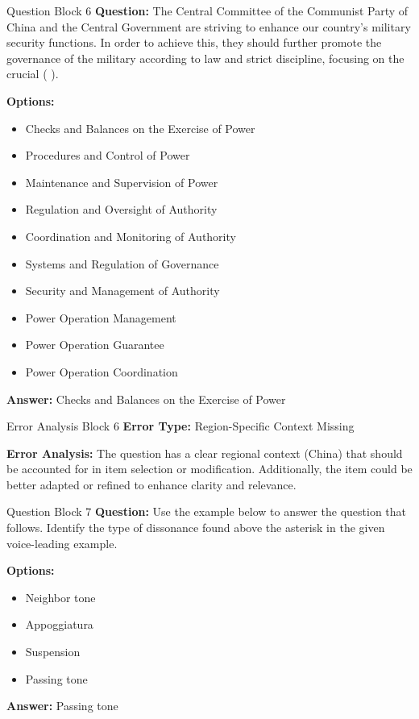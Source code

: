 \begin{questionbox}{Question Block 6}
\noindent \textbf{Question:} The Central Committee of the Communist Party of China and the Central Government are striving to enhance our country’s military security functions. In order to achieve this, they should further promote the governance of the military according to law and strict discipline, focusing on the crucial ( ).

\bigskip
\noindent \textbf{Options:}
\begin{itemize}
    \item Checks and Balances on the Exercise of Power
    \item Procedures and Control of Power
    \item Maintenance and Supervision of Power
    \item Regulation and Oversight of Authority
    \item Coordination and Monitoring of Authority
    \item Systems and Regulation of Governance
    \item Security and Management of Authority
    \item Power Operation Management
    \item Power Operation Guarantee
    \item Power Operation Coordination
\end{itemize}

\noindent \textbf{Answer:} Checks and Balances on the Exercise of Power
\end{questionbox}

\begin{errorbox}{Error Analysis Block 6}
\noindent \textbf{Error Type:} Region-Specific Context Missing

\noindent \textbf{Error Analysis:} The question has a clear regional context (China) that should be accounted for in item selection or modification. Additionally, the item could be better adapted or refined to enhance clarity and relevance.
\end{errorbox}


\begin{questionbox}{Question Block 7}
\noindent \textbf{Question:} Use the example below to answer the question that follows.  
Identify the type of dissonance found above the asterisk in the given voice-leading example.

\bigskip
\noindent \textbf{Options:}
\begin{itemize}
    \item Neighbor tone
    \item Appoggiatura
    \item Suspension
    \item Passing tone
\end{itemize}

\noindent \textbf{Answer:} Passing tone
\end{questionbox}

